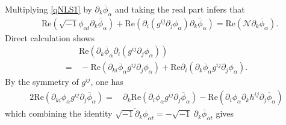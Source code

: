 \documentclass[10pt,twoside,a4paper]{article}
\numberwithin{equation}{section}\allowdisplaybreaks
\begin{document}
	 Multiplying \eqref{qNLS1} by $ \partial_k \overline{\phi}_\alpha $ and taking the real part infers that
\begin{align}  \label{cons1_1}
	&\mathrm{Re} \left(\sqrt{-1}\phi_{\alpha t}\partial_k \overline{\phi}_\alpha \right)+	\mathrm{Re} \left( \partial_i\left( g^{ij} \partial_j \phi_{\alpha }\right)\partial_k \overline{\phi}_\alpha \right)=	\mathrm{Re} \left(\mathcal{N} \partial_k \overline{\phi}_\alpha\right).
\end{align}
 Direct calculation shows
	\begin{align} \label{cons1_2}
	&\mathrm{Re}\left(\partial_k \overline{\phi}_\alpha	\partial_i\left( g^{ij} \partial_j \phi_{\alpha }\right)\right)\\
	=&\,- \mathrm{Re}\left(\partial_{ki} \overline{\phi}_\alpha	 g^{ij} \partial_j \phi_{\alpha }\right)+\mathrm{Re} \partial_i\left(\partial_k \overline{\phi}_\alpha	 g^{ij} \partial_j \phi_{\alpha }\right). \nonumber
\end{align}
By  the  symmetry of  $ g^{ij} $, one has
	\begin{align*}
		2\mathrm{Re}\left(\partial_{ki} \phi_{\alpha }  g^{ij} \partial_j \overline{\phi}_{\alpha }\right)=&\,\partial_k \mathrm{Re}\left(\partial_{i} \phi_{\alpha }  g^{ij} \partial_j \overline{\phi}_{\alpha }\right)-\mathrm{Re}\left(\partial_{i} \phi_{\alpha }  \partial_k h^{ij} \partial_j \overline{\phi}_{\alpha }\right)
\end{align*}
which combining the identity  $ 	\overline{\sqrt{-1}\partial_k \phi_{\alpha t}}=	-\sqrt{-1}~\partial_k\overline{\phi}_{\alpha t} $ gives
\end{document}
